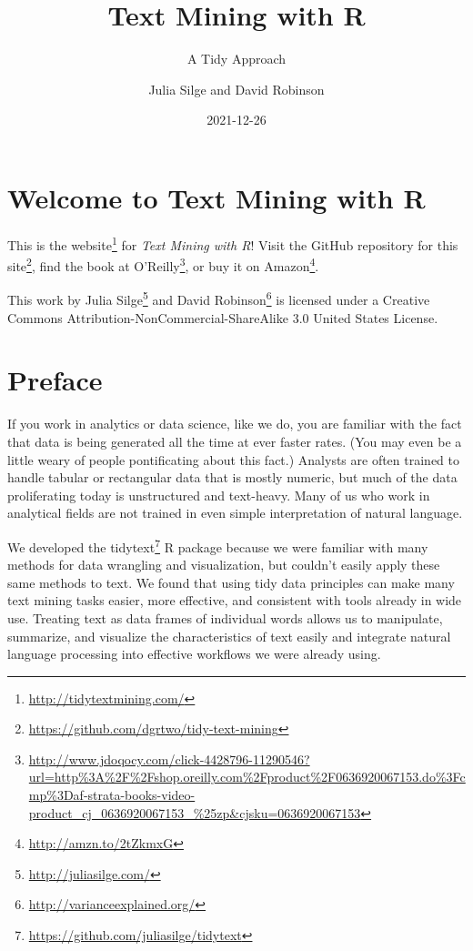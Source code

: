 \documentclass[
]{book}
\title{Text Mining with R}
\subtitle{A Tidy Approach}
\author{Julia Silge and David Robinson}
\date{2021-12-26}
\DeclareRobustCommand{\href}[2]{#2\footnote{\url{#1}}}
\begin{document}
\maketitle

{
\hypersetup{linkcolor=}
\setcounter{tocdepth}{1}
\tableofcontents
}
\hypertarget{welcome-to-text-mining-with-r}{%
\chapter*{Welcome to Text Mining with R}\label{welcome-to-text-mining-with-r}}

This is the \href{http://tidytextmining.com/}{website} for \emph{Text Mining with R}! Visit the \href{https://github.com/dgrtwo/tidy-text-mining}{GitHub repository for this site}, find the book at \href{http://www.jdoqocy.com/click-4428796-11290546?url=http\%3A\%2F\%2Fshop.oreilly.com\%2Fproduct\%2F0636920067153.do\%3Fcmp\%3Daf-strata-books-video-product_cj_0636920067153_\%25zp\&cjsku=0636920067153}{O'Reilly}, or \href{http://amzn.to/2tZkmxG}{buy it on Amazon}.

This work by \href{http://juliasilge.com/}{Julia Silge} and \href{http://varianceexplained.org/}{David Robinson} is licensed under a Creative Commons Attribution-NonCommercial-ShareAlike 3.0 United States License.

\hypertarget{preface}{%
\chapter*{Preface}\label{preface}}

If you work in analytics or data science, like we do, you are familiar with the fact that data is being generated all the time at ever faster rates. (You may even be a little weary of people pontificating about this fact.) Analysts are often trained to handle tabular or rectangular data that is mostly numeric, but much of the data proliferating today is unstructured and text-heavy. Many of us who work in analytical fields are not trained in even simple interpretation of natural language.

We developed the \href{https://github.com/juliasilge/tidytext}{tidytext} \citep{R-tidytext} R package because we were familiar with many methods for data wrangling and visualization, but couldn't easily apply these same methods to text. We found that using tidy data principles can make many text mining tasks easier, more effective, and consistent with tools already in wide use. Treating text as data frames of individual words allows us to manipulate, summarize, and visualize the characteristics of text easily and integrate natural language processing into effective workflows we were already using.
\end{document}
